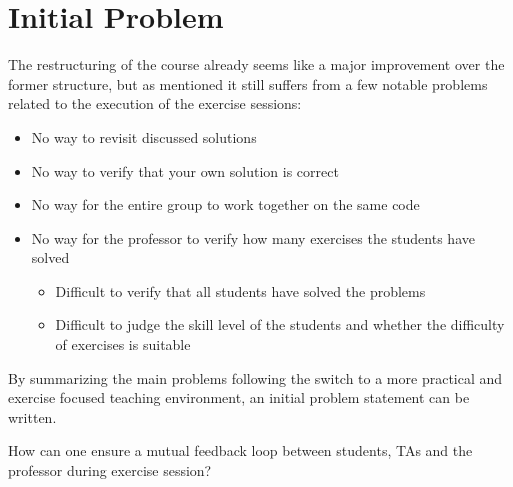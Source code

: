 \section{Initial Problem} \label{sec:initial-problem}
The restructuring of the course already seems like a major improvement over the former structure, but as mentioned it still suffers from a few notable problems related to the execution of the exercise sessions:
\begin{itemize}
	\item No way to revisit discussed solutions
	\item No way to verify that your own solution is correct
	\item No way for the entire group to work together on the same code
	\item No way for the professor to verify how many exercises the students have solved
	\begin{itemize}
		\item Difficult to verify that all students have solved the problems
		\item Difficult to judge the skill level of the students and whether the difficulty of exercises is suitable
	\end{itemize}
\end{itemize}

By summarizing the main problems following the switch to a more practical and exercise focused teaching environment, an initial problem statement can be written.
\begin{displayquote}
How can one ensure a mutual feedback loop between students, TAs and the professor during exercise session?
\end{displayquote} 

